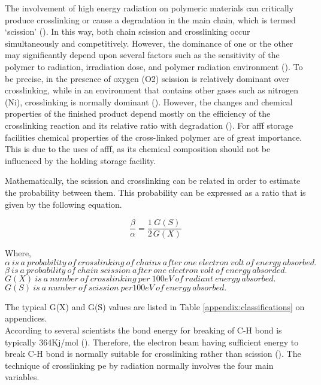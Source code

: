 The involvement of high energy radiation on polymeric materials can critically produce crosslinking or cause a degradation in the main chain, which is termed ‘scission’ (\cite{meola2005cross}). In this way, both chain scission and crosslinking occur simultaneously and competitively. However, the dominance of one or the other may significantly depend upon several factors such as the sensitivity of the polymer to radiation, irradiation dose, and polymer radiation environment (\cite{meola2005cross}). To be precise, in the presence of oxygen (O2) scission is relatively dominant over crosslinking, while in an environment that contains other gases such as nitrogen (Ni), crosslinking is normally dominant (\cite{peacock2000handbook}). However, the changes and chemical properties of the finished product depend mostly on the efficiency of the crosslinking reaction and its relative ratio with degradation (\cite{meola2005cross}). For \acrshort{afff} storage facilities chemical properties of the cross-linked polymer are of great importance. This is due to the uses of \acrshort{afff}, as its chemical composition should not be influenced by the holding storage facility.

Mathematically, the scission and crosslinking can be related in order to estimate the probability between them. This probability can be expressed as a ratio that is given by the following equation.

\begin{equation}
    \frac{\beta}{\alpha}=\frac{1}{2}\frac{G(S)}{G(X)}
\end{equation}

\begin{doublespace}
\noindent Where, \\
$\alpha\ is\ a\ probability\ of\ crosslinking\ of\ chains\ after\ one\ electron\ volt\ of\ energy\ absorbed.$ \\
$\beta\ is\ a\ probability\ of\ chain\ scission\ after\ one\ electron\ volt\ of\ energy\ absorded.$ \\
$G(X)\ is\ a\ number\ of\ crosslinking\ per\ 100eV\ of\ radiant\ energy\ absorbed.$ \\
$G(S)\ is\ a\ number\ of\ scission\ per 100eV\ of\ energy\ absorbed.$ \\
\end{doublespace}

The typical G(X) and G(S) values are listed in Table \ref{appendix:classifications} on appendices. \\

According to several scientists the bond energy for breaking of C-H bond is typically 364Kj/mol (\cite{peacock2000handbook}). Therefore, the electron beam having sufficient energy to break C-H bond is normally suitable for crosslinking rather than scission (\cite{peacock2000handbook}). The technique of crosslinking \acrshort{pe} by radiation normally involves the four main variables. 

